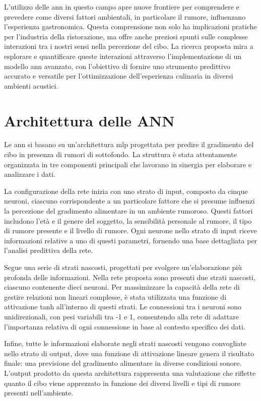 L'utilizzo delle \gls{ann} in questo campo apre nuove frontiere per comprendere e prevedere come diversi fattori ambientali, in particolare il rumore, influenzano l'esperienza gastronomica. Questa comprensione non solo ha implicazioni pratiche per l'industria della ristorazione, ma offre anche preziosi spunti sulle complesse interazioni tra i nostri sensi nella percezione del cibo. La ricerca proposta mira a esplorare e quantificare queste interazioni attraverso l'implementazione di un modello \gls{ann} avanzato, con l'obiettivo di fornire uno strumento predittivo accurato e versatile per l'ottimizzazione dell'esperienza culinaria in diversi ambienti acustici.

\newpage
\section{Architettura delle ANN}
\noindent

Le \gls{ann} si basano su un'architettura \gls{mlp} progettata per predire il gradimento del cibo in presenza di rumori di sottofondo. La struttura è stata attentamente organizzata in tre componenti principali che lavorano in sinergia per elaborare e analizzare i dati.

La configurazione della rete inizia con uno strato di input, composto da cinque neuroni, ciascuno corrispondente a un particolare fattore che si presume influenzi la percezione del gradimento alimentare in un ambiente rumoroso. Questi fattori includono l'età e il genere del soggetto, la sensibilità personale al rumore, il tipo di rumore presente e il livello di rumore. Ogni neurone nello strato di input riceve informazioni relative a uno di questi parametri, fornendo una base dettagliata per l'analisi predittiva della rete.
    
Segue una serie di strati nascosti, progettati per svolgere un'elaborazione più profonda delle informazioni. Nella rete proposta sono presenti due strati nascosti, ciascuno contenente dieci neuroni. Per massimizzare la capacità della rete di gestire relazioni non lineari complesse, è stata utilizzata una funzione di attivazione \gls{tanh} all'interno di questi strati. Le connessioni tra i neuroni sono unidirezionali, con pesi variabili tra -1 e 1, consentendo alla rete di adattare l'importanza relativa di ogni connessione in base al contesto specifico dei dati.

Infine, tutte le informazioni elaborate negli strati nascosti vengono convogliate nello strato di output, dove una funzione di attivazione lineare genera il risultato finale: una previsione del gradimento alimentare in diverse condizioni sonore. L'output prodotto da questa architettura rappresenta una valutazione che riflette quanto il cibo viene apprezzato in funzione dei diversi livelli e tipi di rumore presenti nell'ambiente.


